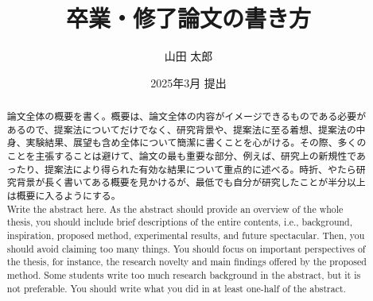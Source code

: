 \documentclass[11pt,a4paper,twoside,openany]{book}
\title{卒業・修了論文の書き方}
\author{山田 太郎}  %
\affiliation{一橋大学大学院 ソーシャル・データサイエンス研究科 修士課程}
\date{2025年3月 提出}
\begin{document}
\frontmatter
\maketitle

\begin{abstract}
  論文全体の概要を書く。概要は、論文全体の内容がイメージできるものである必要があるので、提案法についてだけでなく、研究背景や、提案法に至る着想、提案法の中身、実験結果、展望も含め全体について簡潔に書くことを心がける。その際、多くのことを主張することは避けて、論文の最も重要な部分、例えば、研究上の新規性であったり、提案法により得られた有効な結果について重点的に述べる。時折、やたら研究背景が長く書いてある概要を見かけるが、最低でも自分が研究したことが半分以上は概要に入るようにする。 \\
  
  Write the abstract here. As the abstract should provide an overview of the whole thesis, you should include brief descriptions of the entire contents, i.e., background, inspiration, proposed method, experimental results, and future spectacular. Then, you should avoid claiming too many things. You should focus on important perspectives of the thesis, for instance, the research novelty and main findings offered by the proposed method. Some students write too much research background in the abstract, but it is not preferable. You should write what you did in at least one-half of the abstract.
\end{abstract}

\tableofcontents  %
\clearpage

\listoffigures    %
\clearpage

\listoftables     %
\clearpage

\mainmatter








\begin{acks}

\end{acks}
\end{document}

